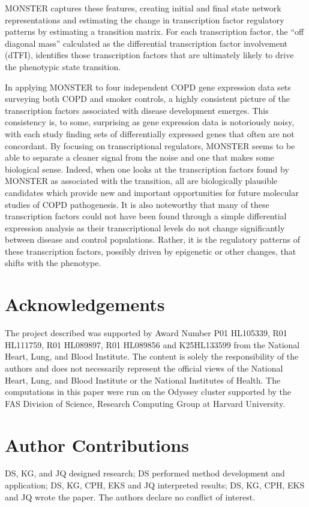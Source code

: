 MONSTER captures these features, creating initial and final state network representations and estimating the change in transcription factor regulatory patterns by estimating a transition matrix. For each transcription factor, the ``off diagonal mass'' calculated as the differential transcription factor involvement (dTFI), identifies those transcription factors that are ultimately likely to drive the phenotypic state transition.

In applying MONSTER to four independent COPD gene expression data sets surveying both COPD and smoker controls, a highly consistent picture of the transcription factors associated with disease development emerges. This consistency is, to some, surprising as gene expression data is notoriously noisy, with each study finding sets of differentially expressed genes that often are not concordant. By focusing on transcriptional regulators, MONSTER seems to be able to separate a cleaner signal from the noise and one that makes some biological sense. Indeed, when one looks at the transcription factors found by MONSTER as associated with the transition, all are biologically plausible candidates which provide new and important opportunities for future molecular studies of COPD pathogenesis. It is also noteworthy that many of these transcription factors could not have been found through a simple differential expression analysis as their transcriptional levels do not change significantly between disease and control populations. Rather, it is the regulatory patterns of these transcription factors, possibly driven by epigenetic or other changes, 
that shifts with the phenotype.


\section*{Acknowledgements}

The project described was supported by Award Number P01 HL105339, R01 HL111759, R01 HL089897, R01 HL089856 and K25HL133599 from the National Heart, Lung, and Blood Institute. The content is solely the responsibility of the authors and does not necessarily represent the official views of the National Heart, Lung, and Blood Institute or the National Institutes of Health. The computations in this paper were run on the Odyssey cluster supported by the FAS Division of Science, Research Computing Group at Harvard University.


\section*{Author Contributions}
DS, KG, and JQ designed research; DS performed method development and application; DS, KG, CPH, EKS and JQ interpreted results;  DS, KG, CPH, EKS and JQ wrote the paper.
The authors declare no conflict of interest.


